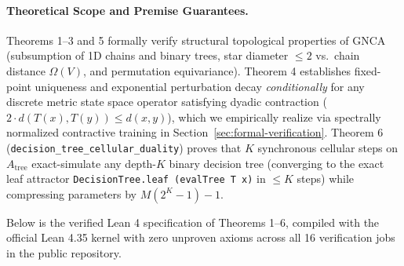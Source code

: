 \documentclass[10pt,twocolumn,letterpaper]{article}
\begin{document}
\paragraph{Theoretical Scope and Premise Guarantees.}
Theorems 1--3 and 5 formally verify structural topological properties of GNCA (subsumption of 1D chains and binary trees, star diameter $\le 2$ vs.\ chain distance $\Omega(V)$, and permutation equivariance). Theorem 4 establishes fixed-point uniqueness and exponential perturbation decay \emph{conditionally} for any discrete metric state space operator satisfying dyadic contraction ($2\cdot d(T(x), T(y)) \le d(x, y)$), which we empirically realize via spectrally normalized contractive training in Section~\ref{sec:formal-verification}. Theorem 6 (\texttt{decision\_tree\_cellular\_duality}) proves that $K$ synchronous cellular steps on $A_{\text{tree}}$ exact-simulate any depth-$K$ binary decision tree (converging to the exact leaf attractor \texttt{DecisionTree.leaf (evalTree T x)} in $\le K$ steps) while compressing parameters by $M(2^K - 1) - 1$.

Below is the verified Lean 4 specification of Theorems 1--6, compiled with the official Lean 4.35 kernel with zero unproven axioms across all 16 verification jobs in the public repository.
\end{document}
